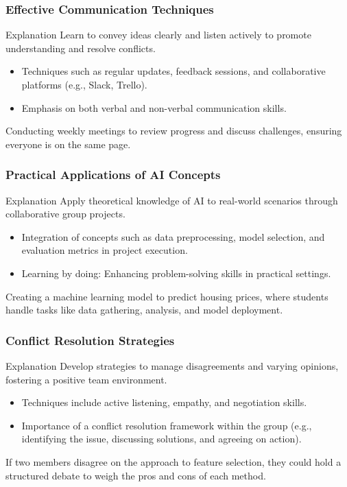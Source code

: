 \documentclass[aspectratio=169]{beamer}
\begin{document}
\begin{frame}[fragile]
    \frametitle{Effective Communication Techniques}
    \begin{block}{Explanation}
        Learn to convey ideas clearly and listen actively to promote understanding and resolve conflicts.
    \end{block}
    \begin{itemize}
        \item Techniques such as regular updates, feedback sessions, and collaborative platforms (e.g., Slack, Trello).
        \item Emphasis on both verbal and non-verbal communication skills.
    \end{itemize}
    \begin{example}
        Conducting weekly meetings to review progress and discuss challenges, ensuring everyone is on the same page.
    \end{example}
\end{frame}

\begin{frame}[fragile]
    \frametitle{Practical Applications of AI Concepts}
    \begin{block}{Explanation}
        Apply theoretical knowledge of AI to real-world scenarios through collaborative group projects.
    \end{block}
    \begin{itemize}
        \item Integration of concepts such as data preprocessing, model selection, and evaluation metrics in project execution.
        \item Learning by doing: Enhancing problem-solving skills in practical settings.
    \end{itemize}
    \begin{example}
        Creating a machine learning model to predict housing prices, where students handle tasks like data gathering, analysis, and model deployment.
    \end{example}
\end{frame}

\begin{frame}[fragile]
    \frametitle{Conflict Resolution Strategies}
    \begin{block}{Explanation}
        Develop strategies to manage disagreements and varying opinions, fostering a positive team environment.
    \end{block}
    \begin{itemize}
        \item Techniques include active listening, empathy, and negotiation skills.
        \item Importance of a conflict resolution framework within the group (e.g., identifying the issue, discussing solutions, and agreeing on action).
    \end{itemize}
    \begin{example}
        If two members disagree on the approach to feature selection, they could hold a structured debate to weigh the pros and cons of each method.
    \end{example}
\end{frame}
\end{document}
